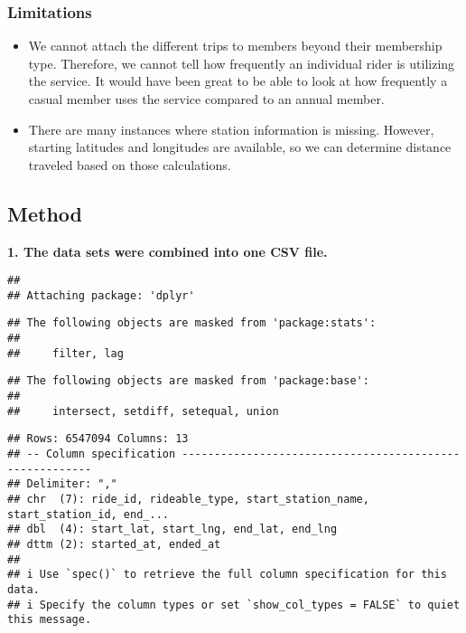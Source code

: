 \documentclass[
]{article}
\providecommand{\tightlist}{%
  \setlength{\itemsep}{0pt}\setlength{\parskip}{0pt}}
\begin{document}
\hypertarget{limitations}{%
\subsubsection{Limitations}\label{limitations}}

\begin{itemize}
\tightlist
\item
  We cannot attach the different trips to members beyond their
  membership type. Therefore, we cannot tell how frequently an
  individual rider is utilizing the service. It would have been great to
  be able to look at how frequently a casual member uses the service
  compared to an annual member.
\item
  There are many instances where station information is missing.
  However, starting latitudes and longitudes are available, so we can
  determine distance traveled based on those calculations.
\end{itemize}

\hypertarget{method}{%
\subsection{Method}\label{method}}

\textbf{1. The data sets were combined into one CSV file.}

\begin{verbatim}
## 
## Attaching package: 'dplyr'
\end{verbatim}

\begin{verbatim}
## The following objects are masked from 'package:stats':
## 
##     filter, lag
\end{verbatim}

\begin{verbatim}
## The following objects are masked from 'package:base':
## 
##     intersect, setdiff, setequal, union
\end{verbatim}

\begin{verbatim}
## Rows: 6547094 Columns: 13
## -- Column specification --------------------------------------------------------
## Delimiter: ","
## chr  (7): ride_id, rideable_type, start_station_name, start_station_id, end_...
## dbl  (4): start_lat, start_lng, end_lat, end_lng
## dttm (2): started_at, ended_at
## 
## i Use `spec()` to retrieve the full column specification for this data.
## i Specify the column types or set `show_col_types = FALSE` to quiet this message.
\end{verbatim}
\end{document}
